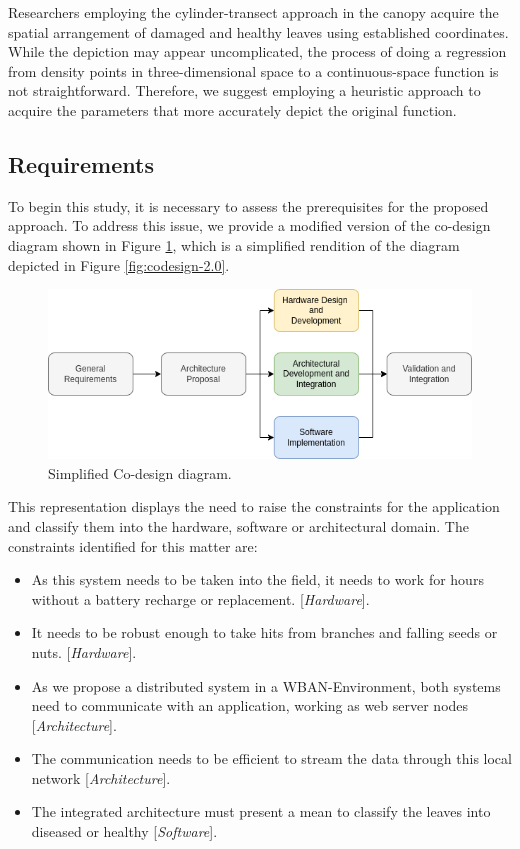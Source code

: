 Researchers employing the cylinder-transect approach in the canopy acquire the spatial arrangement of damaged and healthy leaves using established coordinates. While the depiction may appear uncomplicated, the process of doing a regression from density points in three-dimensional space to a continuous-space function is not straightforward. Therefore, we suggest employing a heuristic approach to acquire the parameters that more accurately depict the original function.

\subsection{Requirements}

To begin this study, it is necessary to assess the prerequisites for the proposed approach. To address this issue, we provide a modified version of the co-design diagram shown in Figure \ref{fig:simplified-codesign-2}, which is a simplified rendition of the diagram depicted in Figure \ref{fig:codesign-2.0}. 

\begin{figure}[ht!]
    \centering
    \includegraphics[width = .8\linewidth]{Figures/simplified-codesign.png}
    \caption{Simplified Co-design diagram.}
    \label{fig:simplified-codesign-2}
\end{figure}

This representation displays the need to raise the constraints for the application and classify them into the hardware, software or architectural domain. The constraints identified for this matter are:

\begin{itemize}
    \item As this system needs to be taken into the field, it needs to work for hours without a battery recharge or replacement. [\textit{Hardware}].
    \item It needs to be robust enough to take hits from branches and falling seeds or nuts. [\textit{Hardware}].
    \item As we propose a distributed system in a WBAN-Environment, both systems need to communicate with an application, working as web server nodes [\textit{Architecture}].
    \item The communication needs to be efficient to stream the data through this local network [\textit{Architecture}].
    \item The integrated architecture must present a mean to classify the leaves into diseased or healthy [\textit{Software}].
\end{itemize}


